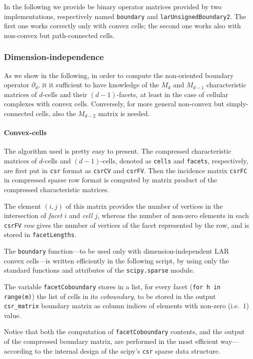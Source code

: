 \documentclass[11pt,oneside]{article}	%
\begin{document}
In the following we provide be binary operator matrices provided by two implementations,
respectively named \texttt{boundary} and \texttt{larUnsignedBoundary2}. The first one works correctly only with convex cells; the second one works also with non-convex but path-connected cells.


\subsubsection{Dimension-independence}

As we show in the following, in order to compute the non-oriented boundary operator $\partial_d$, it it sufficient to have knowledge of the $M_d$ and $M_{d-1}$ characteristic matrices of $d$-cells and their $(d-1)$-facets, at least in the case of cellular complexes with convex cells. Conversely, for more general non-convex but simply-connected cells, also the $M_{d-2}$ matrix is needed.

\paragraph{Convex-cells}

The algorithm used is pretty easy to present. The compressed characteristic matrices of $d$-cells and $(d-1)$-cells, denoted as \texttt{cells} and \texttt{facets}, respectively, are first put in \texttt{csr} format as \texttt{csrCV} and \texttt{csrFV}. Then the incidence matrix \texttt{csrFC} in compressed sparse row format is computed by matrix product of the compressed characteristic matrices. 

The element $(i,j)$ of this matrix provides the number of vertices in the intersection of \emph{facet} $i$ and \emph{cell} $j$, whereas the number of non-zero elements in each \texttt{csrFV} \emph{row} gives the number of vertices of the facet represented by the row, and is stored in \texttt{facetLengths}. 

The \texttt{boundary} function---to be used only with dimension-independent LAR convex cells---is written efficiently in the following script, by using only the standard functions and attributes of the \texttt{scipy.sparse} module.

The variable \texttt{facetCoboundary} stores in a list, for every facet (\texttt{for h in range(m)})
the list of cells in its \emph{coboundary}, to be stored in the output \texttt{csr\_matrix} boundary matrix as column indices of elements with non-zero (i.e.~$1$) value.

Notice that both the computation of \texttt{facetCoboundary} contents, and the output of the compressed boundary matrix, are performed in the most efficient way---according to the internal design of the scipy's \texttt{csr} sparse data structure.
\end{document}
